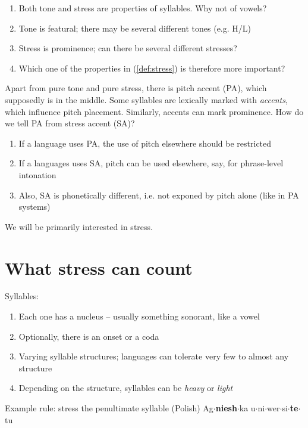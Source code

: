 \documentclass[a4paper, 12pt]{article}
\begin{document}
	\begin{enumerate}[$\gg$]
		\item Both tone and stress are properties of syllables. Why not of vowels?
		\item Tone is featural; there may be several different tones (e.g. H/L)
		\item Stress is prominence; can there be several different stresses?
		\item Which one of the properties in (\ref{def:stress}) is therefore more important?
	\end{enumerate}
	
	Apart from pure tone and pure stress, there is pitch accent (PA), which supposedly is in the middle. Some syllables are lexically marked with \emph{accents}, which influence pitch placement. Similarly, accents can mark prominence. How do we tell PA from stress accent (SA)?
	
	\begin{enumerate}[$\gg$]
		\item If a language uses PA, the use of pitch elsewhere should be restricted
		\item If a languages uses SA, pitch can be used elsewhere, say, for phrase-level intonation
		\item Also, SA is phonetically different, i.e. not exponed by pitch alone (like in PA systems)
	\end{enumerate}
	
	We will be primarily interested in stress.
	
		\section{What stress can count}

	Syllables:
		
	\begin{enumerate}[$\gg$]
		\item Each one has a nucleus -- usually something sonorant, like a vowel
		\item Optionally, there is an onset or a coda
		\item Varying syllable structures; languages can tolerate very few to almost any structure
		\item Depending on the structure, syllables can be \emph{heavy} or \emph{light}
	\end{enumerate}
	
	\pex
		Example rule: stress the penultimate syllable (Polish)
			\a Ag$\cdot$\textbf{niesh}$\cdot$ka
			\a u$\cdot$ni$\cdot$wer$\cdot$si$\cdot$\textbf{te}$\cdot$tu
	\xe
	
\end{document}
